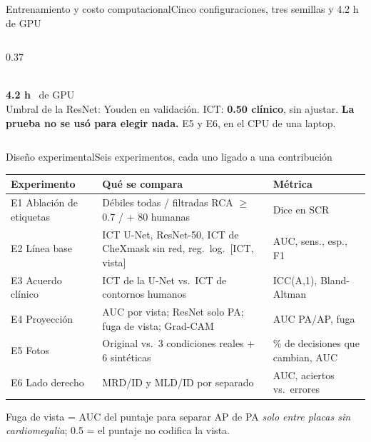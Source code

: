 \documentclass[aspectratio=169,10pt]{beamer}
\newcommand{\cifra}[2]{{\color{#1}\fontsize{26}{28}\selectfont\bfseries #2}}
\newcommand{\nota}[1]{{\color{tinta2}\footnotesize #1}}
\begin{document}
\begin{frame}{Entrenamiento y costo computacional}{Cinco configuraciones, tres semillas y 4.2 h de GPU}
\begin{columns}[T]
\begin{column}{0.37\textwidth}
\\[0.3em]
\cifra{tinta}{4.2 h} \ {\small de GPU}\\[0.4em]
\scriptsize
Umbral de la ResNet: Youden en validación. ICT: \textbf{0.50 clínico}, sin ajustar. \textbf{La prueba no se usó para
elegir nada.} E5 y E6, en el CPU de una laptop.
\end{column}
\end{columns}
\end{frame}

\begin{frame}{Diseño experimental}{Seis experimentos, cada uno ligado a una contribución}
\small
\begin{tabular}{p{}p{}p{}}
\toprule
Experimento & Qué se compara & Métrica \\
\midrule
E1 Ablación de etiquetas & Débiles todas / filtradas RCA $\geq$ 0.7 / + 80 humanas & Dice en SCR \\
E2 Línea base & ICT U-Net, ResNet-50, ICT de CheXmask sin red, reg.\ log.\ [ICT, vista] & AUC, sens., esp., F1 \\
E3 Acuerdo clínico & ICT de la U-Net vs.\ ICT de contornos humanos & ICC(A,1), Bland-Altman \\
E4 Proyección & AUC por vista; ResNet solo PA; fuga de vista; Grad-CAM & AUC PA/AP, fuga \\
E5 Fotos & Original vs.\ 3 condiciones reales + 6 sintéticas & \% de decisiones que cambian, AUC \\
E6 Lado derecho & MRD/ID y MLD/ID por separado & AUC, aciertos vs.\ errores \\
\bottomrule
\end{tabular}

\vspace{0.6em}
\nota{Fuga de vista = AUC del puntaje para separar AP de PA \emph{solo entre placas sin cardiomegalia}; 0.5 = el
puntaje no codifica la vista.}
\end{frame}
\end{document}
